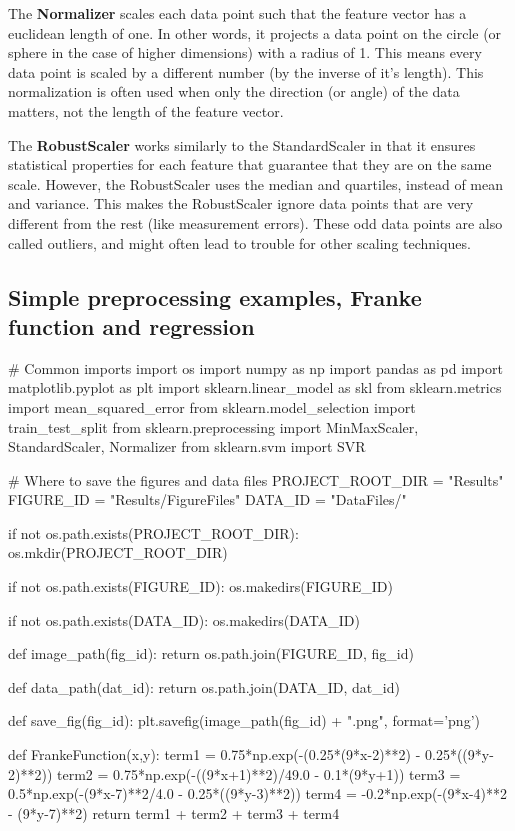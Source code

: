 \documentclass[%
oneside,                 %
final,                   %
10pt]{article}
\begin{document}
The \textbf{Normalizer} scales each data
point such that the feature vector has a euclidean length of one. In other words, it
projects a data point on the circle (or sphere in the case of higher dimensions) with a
radius of 1. This means every data point is scaled by a different number (by the
inverse of it’s length).
This normalization is often used when only the direction (or angle) of the data matters,
not the length of the feature vector.

The \textbf{RobustScaler} works similarly to the StandardScaler in that it
ensures statistical properties for each feature that guarantee that
they are on the same scale. However, the RobustScaler uses the median
and quartiles, instead of mean and variance. This makes the
RobustScaler ignore data points that are very different from the rest
(like measurement errors). These odd data points are also called
outliers, and might often lead to trouble for other scaling
techniques.



\subsection{Simple preprocessing examples, Franke function and regression}

\bpycod
# Common imports
import os
import numpy as np
import pandas as pd
import matplotlib.pyplot as plt
import sklearn.linear_model as skl
from sklearn.metrics import mean_squared_error
from sklearn.model_selection import  train_test_split
from sklearn.preprocessing import MinMaxScaler, StandardScaler, Normalizer
from sklearn.svm import SVR

# Where to save the figures and data files
PROJECT_ROOT_DIR = "Results"
FIGURE_ID = "Results/FigureFiles"
DATA_ID = "DataFiles/"

if not os.path.exists(PROJECT_ROOT_DIR):
    os.mkdir(PROJECT_ROOT_DIR)

if not os.path.exists(FIGURE_ID):
    os.makedirs(FIGURE_ID)

if not os.path.exists(DATA_ID):
    os.makedirs(DATA_ID)

def image_path(fig_id):
    return os.path.join(FIGURE_ID, fig_id)

def data_path(dat_id):
    return os.path.join(DATA_ID, dat_id)

def save_fig(fig_id):
    plt.savefig(image_path(fig_id) + ".png", format='png')


def FrankeFunction(x,y):
	term1 = 0.75*np.exp(-(0.25*(9*x-2)**2) - 0.25*((9*y-2)**2))
	term2 = 0.75*np.exp(-((9*x+1)**2)/49.0 - 0.1*(9*y+1))
	term3 = 0.5*np.exp(-(9*x-7)**2/4.0 - 0.25*((9*y-3)**2))
	term4 = -0.2*np.exp(-(9*x-4)**2 - (9*y-7)**2)
	return term1 + term2 + term3 + term4
\end{document}
